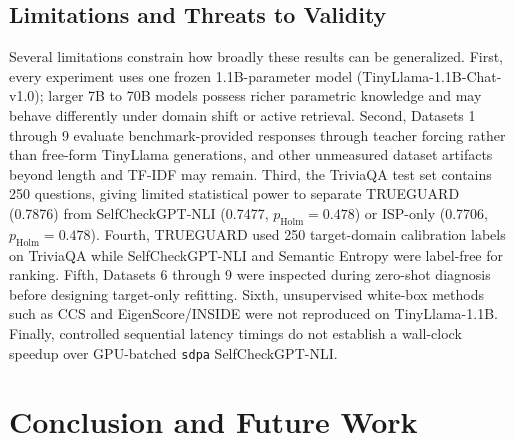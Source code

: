 \documentclass{ieeeaccess}
\begin{document}
\subsection{Limitations and Threats to Validity}
Several limitations constrain how broadly these results can be generalized. First, every experiment uses one frozen 1.1B-parameter model (TinyLlama-1.1B-Chat-v1.0); larger 7B to 70B models possess richer parametric knowledge and may behave differently under domain shift or active retrieval. Second, Datasets 1 through 9 evaluate benchmark-provided responses through teacher forcing rather than free-form TinyLlama generations, and other unmeasured dataset artifacts beyond length and TF-IDF may remain. Third, the TriviaQA test set contains 250 questions, giving limited statistical power to separate TRUEGUARD (0.7876) from SelfCheckGPT-NLI (0.7477, $p_{\text{Holm}} = 0.478$) or ISP-only (0.7706, $p_{\text{Holm}} = 0.478$). Fourth, TRUEGUARD used 250 target-domain calibration labels on TriviaQA while SelfCheckGPT-NLI and Semantic Entropy were label-free for ranking. Fifth, Datasets 6 through 9 were inspected during zero-shot diagnosis before designing target-only refitting. Sixth, unsupervised white-box methods such as CCS \cite{burns2023discovering} and EigenScore/INSIDE \cite{chen2024inside} were not reproduced on TinyLlama-1.1B. Finally, controlled sequential latency timings do not establish a wall-clock speedup over GPU-batched \texttt{sdpa} SelfCheckGPT-NLI.

\section{Conclusion and Future Work}
\label{sec:conclusion}
\end{document}
